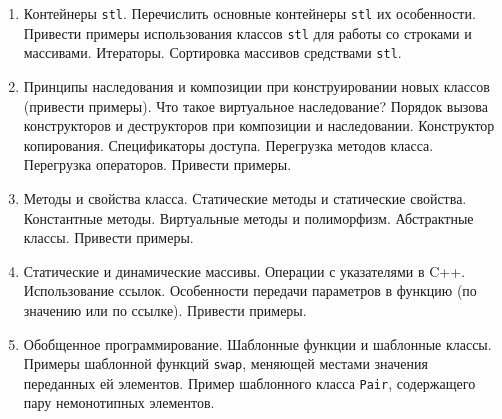 % 
%

\begin{enumerate}
\item Контейнеры \texttt{stl}. Перечислить основные контейнеры \texttt{stl} их особенности. Привести примеры использования классов \texttt{stl} для работы со строками и массивами. Итераторы. Сортировка массивов средствами \texttt{stl}.

\item Принципы наследования и композиции при конструировании новых классов (привести примеры). Что такое виртуальное наследование? Порядок вызова конструкторов и деструкторов при композиции и наследовании. Конструктор копирования. Спецификаторы доступа. Перегрузка методов класса. Перегрузка операторов. Привести примеры.

\item Методы и свойства класса. Статические методы и статические свойства. Константные методы. Виртуальные методы и полиморфизм. Абстрактные классы. Привести примеры.

\item Статические и динамические массивы. Операции с указателями в C++. Использование ссылок. Особенности передачи параметров в функцию (по значению или по ссылке). Привести примеры.

\item Обобщенное программирование. Шаблонные функции и шаблонные классы. Примеры шаблонной функций \texttt{swap}, меняющей местами значения переданных ей элементов. Пример шаблонного класса \texttt{Pair}, содержащего пару немонотипных элементов.
\end{enumerate}
